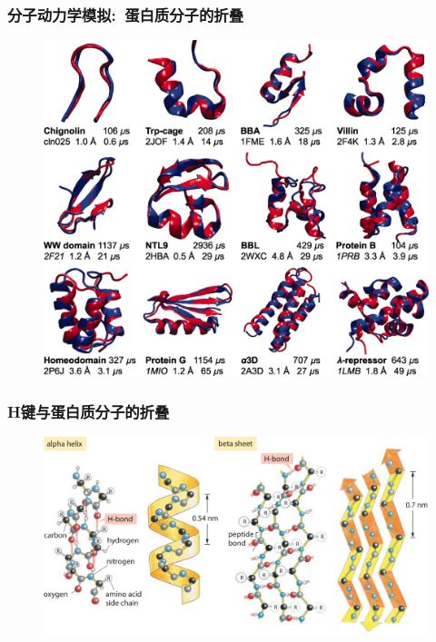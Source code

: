 \frame
{
	\frametitle{分子动力学模拟:~蛋白质分子的折叠}
\begin{figure}[h!]
\centering
\vspace{-13.5pt}
\includegraphics[height=0.75\textwidth,width=1.0\textwidth,viewport=0 0 1290 1130,clip]{Figures/Protein-folding.jpeg}
\label{Protein-folding_2}
\end{figure}
}

\frame
{
	\frametitle{\textrm{H}键与蛋白质分子的折叠}
\begin{figure}[h!]
\centering
\vspace{-5.5pt}
\includegraphics[height=0.57\textwidth,width=1.0\textwidth,viewport=0 0 1100 600,clip]{Figures/310-f1-AlphaBeta-1.png}
\label{Protein-structure-2}
\end{figure}
}

